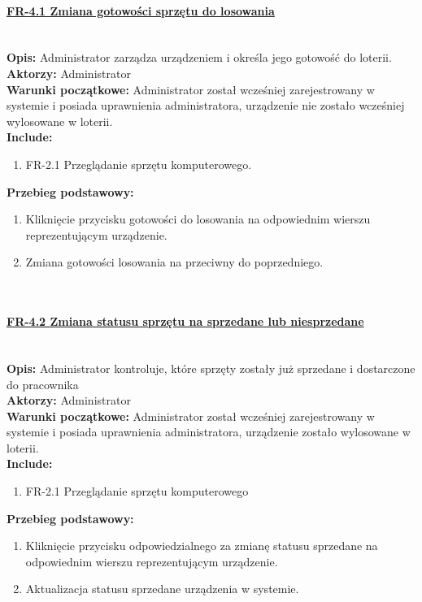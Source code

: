 \paragraph{\underline{FR-4.1 Zmiana gotowości sprzętu do losowania}}\mbox{}\\[1mm]
	\noindent\textbf{Opis:} Administrator zarządza urządzeniem i określa jego gotowość do loterii.\\
	\noindent\textbf{Aktorzy:} Administrator\\
	\textbf{Warunki początkowe:} Administrator został wcześniej zarejestrowany w systemie i posiada uprawnienia administratora, urządzenie nie zostało wcześniej wylosowane w loterii.\\
	\textbf{Include:} 
	\begin{enumerate}[noparskip]
		\item FR-2.1 Przeglądanie sprzętu komputerowego.
	\end{enumerate}
    \textbf{Przebieg podstawowy:}
	\begin{enumerate}[noparskip]
		\item Kliknięcie przycisku gotowości do losowania na odpowiednim wierszu reprezentującym urządzenie.
		\item Zmiana gotowości losowania na przeciwny do poprzedniego.
  \end{enumerate} \mbox{}\\[-11mm]

\paragraph{\underline{FR-4.2 Zmiana statusu sprzętu na sprzedane lub niesprzedane}}\mbox{}\\[1mm]
	\noindent\textbf{Opis:} Administrator kontroluje, które sprzęty zostały już sprzedane i dostarczone do pracownika\\
	\noindent\textbf{Aktorzy:} Administrator\\
	\textbf{Warunki początkowe:} Administrator został wcześniej zarejestrowany w systemie i posiada uprawnienia administratora, urządzenie zostało wylosowane w loterii.\\
	\textbf{Include:} 
	\begin{enumerate}[noparskip]
		\item FR-2.1 Przeglądanie sprzętu komputerowego
	\end{enumerate}
  \textbf{Przebieg podstawowy:}
	\begin{enumerate}[noparskip]
		\item Kliknięcie przycisku odpowiedzialnego za zmianę statusu sprzedane na odpowiednim wierszu reprezentującym urządzenie.
		\item Aktualizacja statusu sprzedane urządzenia w systemie.
  \end{enumerate} \mbox{}\\[-11mm]

